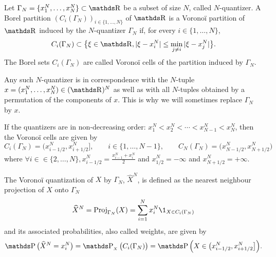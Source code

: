 \begin{definition}
	Let $\Gamma_N = \{ x_1^N, \dots, x_N^N \} \subset \R$ be a subset of size $N$, called $N$-quantizer. A Borel partition $( C_i (\Gamma_N))_{i \in \{ 1, \dots, N \} }$ of $\R$ is a Voronoï partition of $\R$ induced by the $N$-quantizer $\Gamma_N$ if, for every $i \in \{ 1, \dots, N \} $,
	\begin{equation*}
		C_i (\Gamma_N) \subset \big\{ \xi \in \R, \vert \xi - x_i^N \vert \leq \min_{j \neq i }\vert \xi - x_j^N \vert \big\}.
	\end{equation*}
	The Borel sets $C_i (\Gamma_N)$ are called Voronoï cells of the partition induced by $\Gamma_N$.
\end{definition}

\begin{remark}
	Any such $N$-quantizer is in correspondence with the $N$-tuple $x = ( x_1^N, \dots, x_N^N ) \in ( \R )^N$ as well as with all $N$-tuples obtained by a permutation of the components of $x$. This is why we will sometimes replace $\Gamma_N$ by $x$.
\end{remark}

\medskip
If the quantizers are in non-decreasing order: $x_1^N < x_2^N < \cdots < x_{N-1}^N < x_{N}^N$, then the Voronoï cells are given by
\begin{equation}\label{RH:def_voronoi_cells}
	C_i ( \Gamma_N ) = \big( x_{i - 1/2}^N, x_{i + 1/2}^N \big], \qquad i \in \{ 1, \dots,  N-1 \}, \qquad C_{N} ( \Gamma_N ) = \big( x_{N - 1/2}^N, x_{N + 1/2}^N \big)
\end{equation}
where $\forall i \in \in \{ 2, \dots,  N \}, x_{i-1/2}^N = \frac{x_{i-1}^N + x_i^N}{2}$ and $x_{1/2}^N = - \infty$ and $x_{N+1/2}^N =  + \infty$.

\begin{definition}
	The Vorono\"i quantization of $X$ by $\Gamma_N$, $\widehat X^N$, is defined as the nearest neighbour projection of $X$ onto $\Gamma_N$
	\begin{equation}\label{RH:quantizOfX}
		\widehat X^N = \Proj_{\Gamma_N} (X) = \sum_{i = 1}^N x_i^N \1_{X \in C_i (\Gamma_N) }
	\end{equation}
	and its associated probabilities, also called weights, are given by
	\begin{equation*}
		\Prob \big( \widehat X^N = x_i^N \big) = \Prob_{_{X}} \big( C_i (\Gamma_N) \big) = \Prob \Big( X \in \big( x_{i - 1/2}^N, x_{i + 1/2}^N \big] \Big).
	\end{equation*}
\end{definition}


